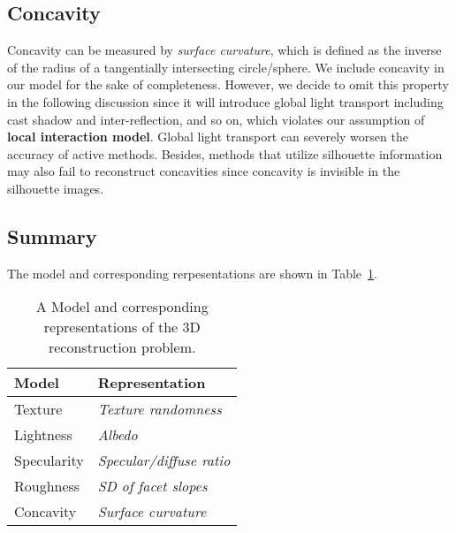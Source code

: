 
\subsection{Concavity}
Concavity can be measured by \textit{surface curvature}, which is defined as the inverse of the radius of a tangentially intersecting circle/sphere. We include concavity in our model for the sake of completeness. However, we decide to omit this property in the following discussion since it will introduce global light transport including cast shadow and inter-reflection, and so on, which violates our assumption of \textbf{local interaction model}. Global light transport can severely worsen the accuracy of active methods. Besides, methods that utilize silhouette information may also fail to reconstruct concavities since concavity is invisible in the silhouette images.


\subsection{Summary}
The model and corresponding rerpesentations are shown in Table~\ref{tab:3DRecon_model_repre}.
\begin{table}[!htbp]
  \centering
  \begin{tabular}{l|l}
  \toprule
  \textbf{Model} & \textbf{Representation}\\
  \midrule
  Texture & \textit{Texture randomness}\\
  Lightness & \textit{Albedo}\\
  Specularity & \textit{Specular/diffuse ratio}\\
  Roughness & \textit{SD of facet slopes}\\
  Concavity & \textit{Surface curvature}\\
  \bottomrule
  \end{tabular}
  \caption{A Model and corresponding representations of the 3D reconstruction problem.}
  \label{tab:3DRecon_model_repre}
\end{table}

